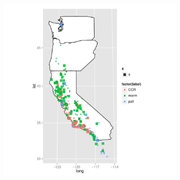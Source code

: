 \documentclass{article}\usepackage{graphicx, color}
\begin{document}
\begin{figure}[t]
\begin{subfigure}[b]{0.5\textwidth}
    \includegraphics[width = \textwidth]{figure/nnet-map2}
    \label{fig:nnet-map2}
  \end{subfigure}\\


\end{figure}
\end{document}
